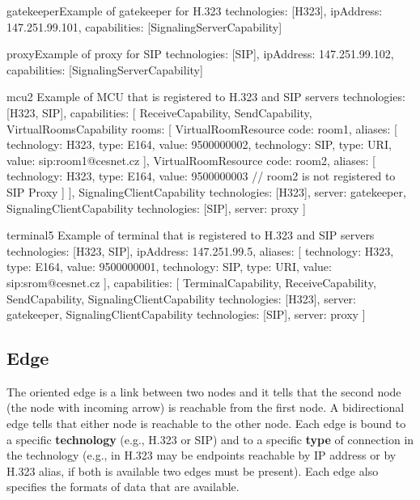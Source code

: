\begin{itemize}
\begin{EntityExample}{}{gatekeeper}{Example of gatekeeper for H.323}
technologies: [H323],
ipAddress: 147.251.99.101,
capabilities: [SignalingServerCapability]
\end{EntityExample}

\begin{EntityExample}{}{proxy}{Example of proxy for SIP}
technologies: [SIP],
ipAddress: 147.251.99.102,
capabilities: [SignalingServerCapability]
\end{EntityExample}

\begin{EntityExample}{}{mcu2}%
      {Example of MCU that is registered to H.323 and SIP servers}
technologies: [H323, SIP],
capabilities: [
  ReceiveCapability,
  SendCapability,
  VirtualRoomsCapability {rooms: [
    VirtualRoomResource {code: room1, aliases: [
      {technology: H323, type: E164, value: 9500000002},
      {technology: SIP, type: URI, value: sip:room1@cesnet.cz}
    ]}, 
    VirtualRoomResource {code: room2, aliases: [
      {technology: H323, type: E164, value: 9500000003}
      // room2 is not registered to SIP Proxy
    ]}
  ]},
  SignalingClientCapability {technologies: [H323], server: gatekeeper},  
  SignalingClientCapability {technologies: [SIP], server: proxy}
]
\end{EntityExample}

\begin{EntityExample}{}{terminal5}%
      {Example of terminal that is registered to H.323 and SIP servers}
technologies: [H323, SIP],
ipAddress: 147.251.99.5,
aliases: [
  {technology: H323, type: E164, value: 9500000001},
  {technology: SIP, type: URI, value: sip:srom@cesnet.cz}
],
capabilities: [
  TerminalCapability,
  ReceiveCapability,
  SendCapability,
  SignalingClientCapability {technologies: [H323], server: gatekeeper},
  SignalingClientCapability {technologies: [SIP], server: proxy}
]
\end{EntityExample}

\end{itemize}
 

\subsection{Edge}

The oriented edge is a link between two nodes and it tells that the second 
node (the node with incoming arrow) is reachable from the first node. A 
bidirectional edge tells that either node is reachable to the other node. 
Each edge is bound to a specific \textbf{technology} (e.g., H.323 or SIP) and 
to a specific \textbf{type} of connection in the technology (e.g., in H.323 
may be endpoints reachable by IP address or by H.323 alias, if both is 
available two edges must be present). Each edge also specifies the formats of data that are available.

